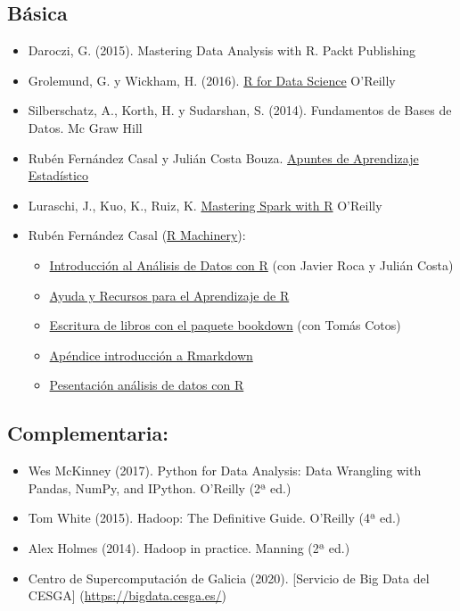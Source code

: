 \documentclass[
]{book}
\providecommand{\tightlist}{%
  \setlength{\itemsep}{0pt}\setlength{\parskip}{0pt}}
\begin{document}
\hypertarget{buxe1sica}{%
\subsection{Básica}\label{buxe1sica}}

\begin{itemize}
\item
  Daroczi, G. (2015). Mastering Data Analysis with R. Packt Publishing
\item
  Grolemund, G. y Wickham, H. (2016). \href{https://r4ds.had.co.nz/}{R for Data Science} O'Reilly
\item
  Silberschatz, A., Korth, H. y Sudarshan, S. (2014). Fundamentos de Bases de Datos. Mc Graw Hill
\item
  Rubén Fernández Casal y Julián Costa Bouza. \href{https://rubenfcasal.github.io/aprendizaje_estadistico/}{Apuntes de Aprendizaje Estadístico}
\item
  Luraschi, J., Kuo, K., Ruiz, K. \href{https://therinspark.com/}{Mastering Spark with R} O'Reilly
\item
  Rubén Fernández Casal (\href{https://rubenfcasal.github.io}{R Machinery}):

  \begin{itemize}
  \item
    \href{https://rubenfcasal.github.io/intror}{Introducción al Análisis de Datos con R}
    (con Javier Roca y Julián Costa)
  \item
    \href{https://rubenfcasal.github.io/post/ayuda-y-recursos-para-el-aprendizaje-de-r}{Ayuda y Recursos para el Aprendizaje de R}
  \item
    \href{https://rubenfcasal.github.io/bookdown_intro}{Escritura de libros con el paquete bookdown}
    (con Tomás Cotos)
  \item
    \href{https://rubenfcasal.github.io/bookdown_intro/rmarkdown.html}{Apéndice introducción a Rmarkdown}
  \item
    \href{https://rubenfcasal.github.io/post/presentaciones/AnalisisDatosR.pdf}{Pesentación análisis de datos con R}
  \end{itemize}
\end{itemize}

\hypertarget{complementaria}{%
\subsection{Complementaria:}\label{complementaria}}

\begin{itemize}
\tightlist
\item
  Wes McKinney (2017). Python for Data Analysis: Data Wrangling with Pandas, NumPy, and IPython. O'Reilly (2ª ed.)
\item
  Tom White (2015). Hadoop: The Definitive Guide. O'Reilly (4ª ed.)
\item
  Alex Holmes (2014). Hadoop in practice. Manning (2ª ed.)
\item
  Centro de Supercomputación de Galicia (2020). {[}Servicio de Big Data del CESGA{]} (\url{https://bigdata.cesga.es/})
\end{itemize}
\end{document}
